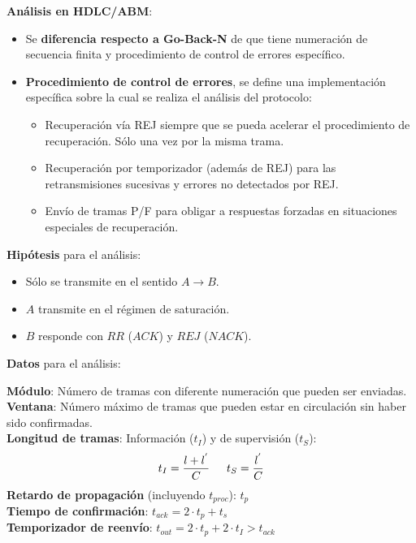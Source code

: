 \documentclass[10pt,landscape]{article}
\begin{document}
\begin{multicols}{3}
\textbf{Análisis en HDLC/ABM}:

	\begin{itemize}
		\item Se \textbf{diferencia respecto a Go-Back-N} de que tiene numeración de secuencia finita y procedimiento de control de errores específico.
		\item \textbf{Procedimiento de control de errores}, se define una implementación específica sobre la cual se realiza el análisis del protocolo:
			\begin{itemize}
				\item Recuperación vía REJ siempre que se pueda acelerar el procedimiento de recuperación. Sólo una vez por la misma trama.
				\item Recuperación por temporizador (además de REJ) para las retransmisiones sucesivas y errores no detectados por REJ.
				\item Envío de tramas P/F para obligar a respuestas forzadas en situaciones especiales de recuperación.
			\end{itemize}
	\end{itemize}
	
\textbf{Hipótesis} para el análisis:

	\begin{itemize}
		\item Sólo se transmite en el sentido $A \rightarrow B$.
		\item $A$ transmite en el régimen de saturación.
		\item $B$ responde con $RR$ ($ACK$) y $REJ$ ($NACK$).
	\end{itemize}
	
\textbf{Datos} para el análisis:

\textbf{Módulo}: Número de tramas con diferente numeración que pueden ser enviadas.\\
\textbf{Ventana}: Número máximo de tramas que pueden estar en circulación sin haber sido confirmadas.\\
\textbf{Longitud de tramas}: Información ($t_{I}$) y de supervisión ($t_{S}$):
	\begin{equation*}
		t_{I} = \frac{l + l^{'}}{C} \hspace{15 pt} t_{S} = \frac{l^{'}}{C}
	\end{equation*}
\textbf{Retardo de propagación} (incluyendo $t_{proc}$): $t_{p}$\\
\textbf{Tiempo de confirmación}: $t_{ack} = 2 \cdot t_{p} + t_{s}$\\
\textbf{Temporizador de reenvío}: $t_{out} = 2 \cdot t_{p} + 2 \cdot t_{I} > t_{ack}$\\	
	

\end{multicols}
\end{document}
